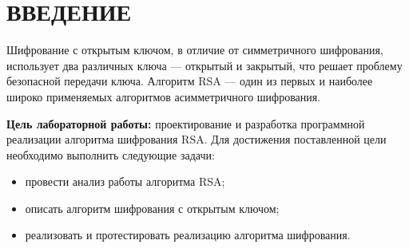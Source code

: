 \chapter*{ВВЕДЕНИЕ}

Шифрование с открытым ключом, в отличие от симметричного шифрования, использует два различных ключа — открытый и закрытый, что решает проблему безопасной передачи ключа. Алгоритм RSA --- один из первых и наиболее широко применяемых алгоритмов асимметричного шифрования.

\textbf{Цель лабораторной работы:} проектирование и разработка программной реализации алгоритма шифрования RSA. Для достижения поставленной цели необходимо выполнить следующие задачи:

\begin{itemize}[label=---]
	\item провести анализ работы алгоритма RSA;
	\item описать алгоритм шифрования с открытым ключом;
    \item реализовать и протестировать реализацию алгоритма шифрования.
\end{itemize}
